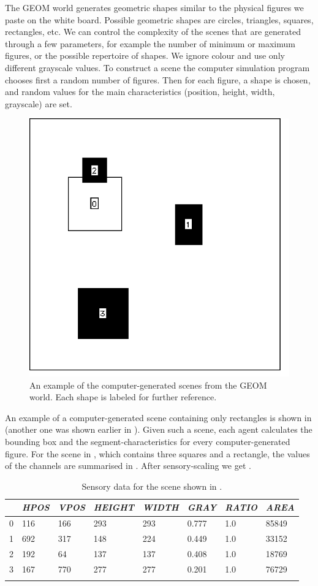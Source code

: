 The GEOM world generates geometric shapes similar 
to the physical figures we paste on the white board. 
Possible geometric shapes are circles, triangles, 
squares, rectangles, etc. 
We can control the complexity
of the scenes that are generated  through a few parameters, for example the 
number of minimum or maximum figures, or the possible 
repertoire of shapes. We 
ignore colour and use only different grayscale 
values. To construct a scene the computer simulation 
program chooses first a random number of 
figures. Then for each figure, a shape is 
chosen, and random values for the main 
characteristics (position, height, width, grayscale)
are set. 

\begin{figure}[htbp]
  \centerline{\includegraphics[width=.45\textwidth]{chap3/figs/scene9}}
\caption{ \label{geom3} An example of the 
computer-generated scenes from the GEOM world.
Each shape is labeled for further reference.}
\end{figure}

An example of a computer-generated 
scene containing only rectangles is shown in 
 (another one 
was shown earlier in ).
Given such a scene, each agent calculates
the bounding box and the segment-characteristics
for every computer-generated figure.
For the scene in , which contains three
squares and a rectangle, the values of the channels
are summarised in . After sensory-scaling we get . 

\begin{table}
\begin{center}
\begin{tabular}{  l   l   l   l   l   l   l   l  }
\lsptoprule
 & {\itshape HPOS} & {\itshape VPOS} & {\itshape HEIGHT} & {\itshape WIDTH} & {\itshape GRAY} & {\itshape RATIO}  & {\itshape AREA} \\ \midrule
0 & 116 & 166 & 293 & 293 & 0.777 & 1.0 & 85849 \\ 
1 & 692 & 317 & 148 & 224 & 0.449 & 1.0 & 33152 \\ 
2 & 192 & 64 & 137 & 137 & 0.408 & 1.0 & 18769 \\ 
3 & 167 & 770 & 277 & 277 & 0.201 & 1.0 & 76729 \\ 
\lspbottomrule
\end{tabular}
\end{center}
\caption{\label{tab:t-geom} Sensory data for the scene shown in .}
\end{table}


